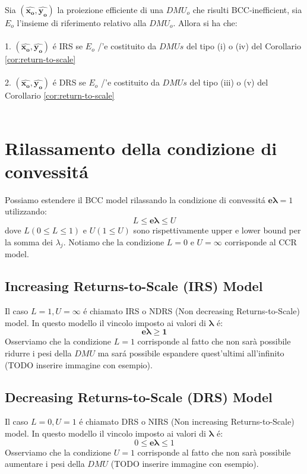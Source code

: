 \begin{teor} \label{EQ:return-to-scale}
Sia $(\hat{\boldsymbol{x_o}}, \hat{\boldsymbol{y_o}})$ la proiezione efficiente di una $DMU_o$ che risulti BCC-inefficient, sia $E_o$ l'insieme di riferimento relativo alla $DMU_o$. Allora si ha che:\\\\
1. $(\boldsymbol{\hat{x_o}}, \hat{\boldsymbol{y_o}})$ \'e IRS se $E_o$ /'e costituito da $DMUs$ del tipo (i) o (iv) del Corollario \ref{cor:return-to-scale} \\\\
2. $(\boldsymbol{\hat{x_o}}, \hat{\boldsymbol{y_o}})$ \'e DRS se $E_o$ /'e costituito da $DMUs$ del tipo (iii) o (v) del Corollario \ref{cor:return-to-scale} \\\\
\end{teor}
\section{Rilassamento della condizione di convessit\'a}
\bigskip
Possiamo estendere il BCC model rilassando la condizione di convessit\'a $\boldsymbol{e\lambda} = 1$ utilizzando:
\begin{equation}
L \leq \boldsymbol{ e\lambda} \leq U
\end{equation}
dove $L (0 \leq L \leq 1)$ e $U (1 \leq U)$ sono rispettivamente upper e lower bound per la somma dei $\lambda_j$. Notiamo che la condizione $L = 0$ e $U = \infty$ corrisponde al CCR model.
\subsection{Increasing Returns-to-Scale (IRS) Model}
\bigskip
Il caso $L = 1, U = \infty$ \'e chiamato IRS o NDRS (Non decreasing Returns-to-Scale) model. In questo modello il vincolo imposto ai valori di $\boldsymbol{\lambda}$ \'e:
\begin{equation}
\boldsymbol{e\lambda \geq 1}
\end{equation}
Osserviamo che la condizione $L=1$ corrisponde al fatto che non sarà possibile ridurre i pesi della $DMU$ ma sar\'a possibile espandere quest'ultimi all'infinito (TODO inserire immagine con esempio).
\subsection{Decreasing Returns-to-Scale (DRS) Model}
\bigskip
Il caso $L = 0, U = 1$ \'e chiamato DRS o NIRS (Non increasing Returns-to-Scale) model. In questo modello il vincolo imposto ai valori di $\boldsymbol{\lambda}$ \'e:
\begin{equation}
0 \leq \boldsymbol{e\lambda} \leq 1
\end{equation}
Osserviamo che la condizione $U=1$ corrisponde al fatto che non sarà possibile aumentare i pesi della $DMU$ (TODO inserire immagine con esempio).
